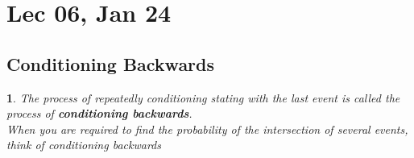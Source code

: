 \documentclass[11pt]{article}
\newtheorem{definition}{\framebox{DEF}}[section]
\begin{document}
    \section{Lec 06, Jan 24}
            \subsection{Conditioning Backwards}
                \begin{definition}
                    The process of repeatedly conditioning stating with the last event is called the process of \textbf{\textit{conditioning backwards}}.\\
                    When you are required to find the probability of the intersection of several events, think of conditioning backwards
                \end{definition}
                
\end{document}
